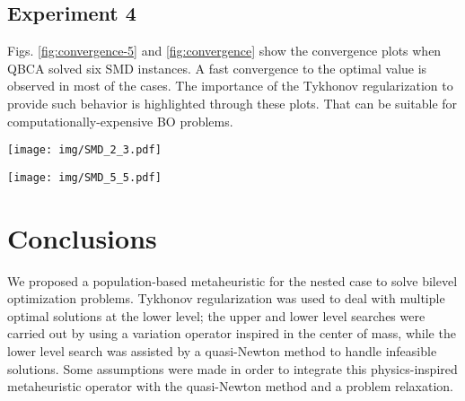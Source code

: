 \documentclass[conference]{IEEEtran}
\theoremstyle{definition}
\begin{document}
\subsection{Experiment 4} %

Figs. \ref{fig:convergence-5} and \ref{fig:convergence} show the convergence plots
when QBCA solved six SMD instances. A fast convergence to the optimal value is
observed in most of the cases. The importance of the Tykhonov regularization to
provide such behavior is highlighted through these plots. That can be suitable
for computationally-expensive BO problems.

\begin{figure*}[ht]
    \centering
    \texttt{[image: img/SMD\_2\_3.pdf]}
    \caption{Convergence plot for median upper level function value obtained from
             31 independent runs of QBCA on SMD1-SMD5 and SMD8 low-dimensional
             problems. Log scale is used for visualization purposes.}
    \label{fig:convergence-5}
\end{figure*}

\begin{figure*}[ht]
    \centering
    \texttt{[image: img/SMD\_5\_5.pdf]}
    \caption{Convergence plot for median upper level function value obtained from
             31 independent runs of QBCA on SMD1-SMD5 and SMD8 high-dimensional
             problems. Log scale is used for visualization purposes.}
    \label{fig:convergence}
\end{figure*}








\section{Conclusions} %
\label{sec:conclusions}


We proposed a population-based metaheuristic for the nested case to solve bilevel
optimization problems. Tykhonov regularization was used to deal with multiple
optimal solutions at the lower level; the upper and lower level searches were
carried out by using a variation operator inspired in the center of mass, while
the lower level search was assisted by a quasi-Newton method to handle infeasible
solutions. Some assumptions were made in order to integrate this physics-inspired
metaheuristic operator with the quasi-Newton method and a problem relaxation.
\end{document}
